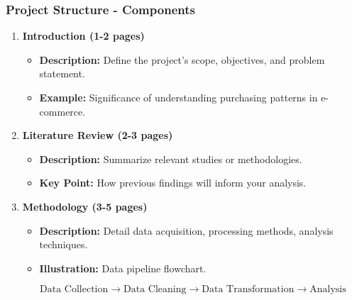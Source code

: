 \documentclass[aspectratio=169]{beamer}
\begin{document}
\begin{frame}[fragile]
    \frametitle{Project Structure - Components}

    \begin{enumerate}
        \item \textbf{Introduction (1-2 pages)}
            \begin{itemize}
                \item \textbf{Description:} Define the project's scope, objectives, and problem statement.
                \item \textbf{Example:} Significance of understanding purchasing patterns in e-commerce.
            \end{itemize}

        \item \textbf{Literature Review (2-3 pages)}
            \begin{itemize}
                \item \textbf{Description:} Summarize relevant studies or methodologies.
                \item \textbf{Key Point:} How previous findings will inform your analysis.
            \end{itemize}

        \item \textbf{Methodology (3-5 pages)}
            \begin{itemize}
                \item \textbf{Description:} Detail data acquisition, processing methods, analysis techniques.
                \item \textbf{Illustration:} Data pipeline flowchart.
                \end{itemize}
                \begin{equation}
                \text{Data Collection} \rightarrow \text{Data Cleaning} \rightarrow \text{Data Transformation} \rightarrow \text{Analysis}
                \end{equation}
    \end{enumerate}
\end{frame}
\end{document}
